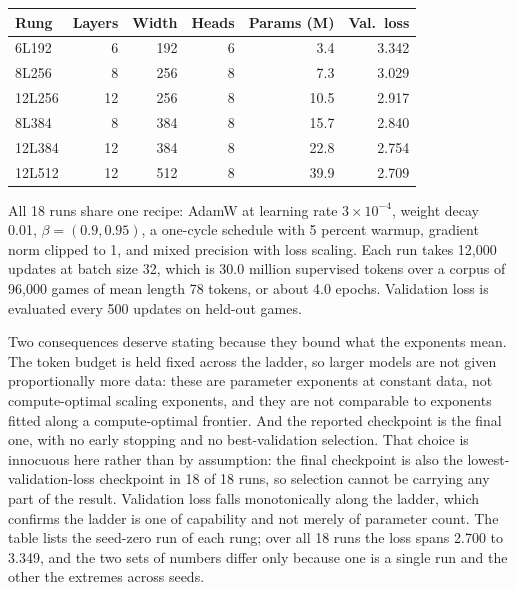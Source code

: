 \documentclass[11pt]{article}
\begin{document}
\begin{center}
\small
\begin{tabular}{lrrrrr}
\toprule
\textbf{Rung} & \textbf{Layers} & \textbf{Width} & \textbf{Heads} & \textbf{Params (M)} & \textbf{Val.\ loss} \\
\midrule
6L192 & 6 & 192 & 6 & 3.4 & 3.342 \\
8L256 & 8 & 256 & 8 & 7.3 & 3.029 \\
12L256 & 12 & 256 & 8 & 10.5 & 2.917 \\
8L384 & 8 & 384 & 8 & 15.7 & 2.840 \\
12L384 & 12 & 384 & 8 & 22.8 & 2.754 \\
12L512 & 12 & 512 & 8 & 39.9 & 2.709 \\
\bottomrule
\end{tabular}
\end{center}

All 18 runs share one recipe: AdamW at learning rate $3\times10^{-4}$, weight decay
0.01, $\beta = (0.9, 0.95)$, a one-cycle schedule with
5 percent warmup, gradient norm clipped to 1, and mixed precision with
loss scaling. Each run takes
12,000 updates at batch size 32, which is 30.0 million supervised tokens
over a corpus of 96,000 games of mean length 78 tokens, or about
4.0 epochs. Validation loss is evaluated every 500 updates on held-out games.

Two consequences deserve stating because they bound what the exponents mean. The
token budget is held fixed across the ladder, so larger models are not given
proportionally more data: these are parameter exponents at constant data, not
compute-optimal scaling exponents, and they are not comparable to exponents fitted
along a compute-optimal frontier. And the reported checkpoint is the final one, with
no early stopping and no best-validation selection. That choice is innocuous here
rather than by assumption: the final checkpoint is also the lowest-validation-loss
checkpoint in 18 of 18 runs, so selection cannot be carrying any part of
the result. Validation loss falls monotonically along the ladder, which confirms the
ladder is one of capability and not merely of parameter count. The table lists the
seed-zero run of each rung; over all 18 runs the loss spans 2.700 to
3.349, and the two sets of numbers differ only because one is a single run and
the other the extremes across seeds.
\end{document}
